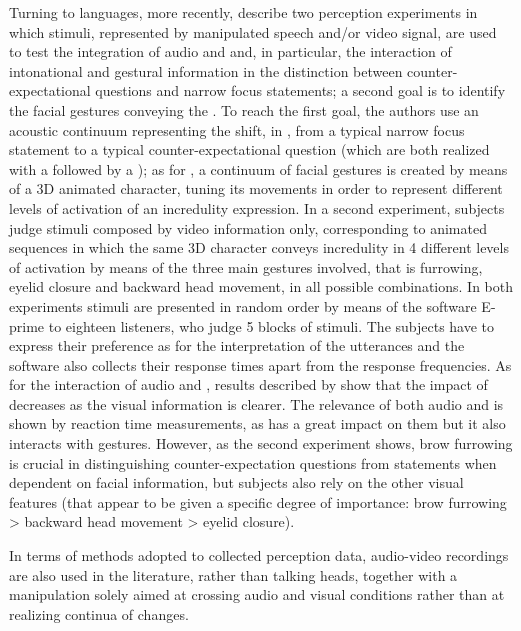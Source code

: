 \documentclass[output=paper]{langsci/langscibook}
\begin{document}
Turning to  languages, more recently, \citet{BorrasComes2011} describe two perception experiments in which stimuli, represented by manipulated speech and\slash or video signal, are used to test the integration of audio and  and, in particular, the interaction of intonational and gestural information in the distinction between counter-expectational questions and narrow focus statements; a second goal is to identify the facial gestures conveying the . To reach the first goal, the authors use an acoustic continuum representing the shift, in , from a typical narrow focus statement to a typical  counter-expectational question (which are both realized with a  followed by a ); as for , a continuum of facial gestures is created by means of a 3D animated character, tuning its movements in order to represent different levels of activation of an incredulity expression. In a second experiment, subjects judge stimuli composed by video information only, corresponding to animated sequences in which the same 3D character conveys incredulity in 4 different levels of activation by means of the three main gestures involved, that is  furrowing, eyelid closure and backward head movement, in all possible combinations. In both experiments stimuli are presented in random order by means of the software E-prime to eighteen  listeners, who judge 5 blocks of stimuli. The subjects have to express their preference as for the interpretation of the utterances and the software also collects their response times apart from the response frequencies. As for the interaction of audio and , results described by \citet{BorrasComes2011} show that the impact of  decreases as the visual  information is clearer. The relevance of both audio and  is shown by reaction time measurements, as  has a great impact on them but it also interacts with gestures. However, as the second experiment shows, brow furrowing is crucial in distinguishing counter-expectation questions from  statements when dependent on facial  information, but subjects also rely on the other visual features (that appear to be given a specific degree of importance: brow furrowing > backward head movement > eyelid closure). 

In terms of methods adopted to collected perception data, audio-video recordings are also used in the literature, rather than talking heads, together with a manipulation solely aimed at crossing audio and visual conditions rather than at realizing continua of changes.
\end{document}
